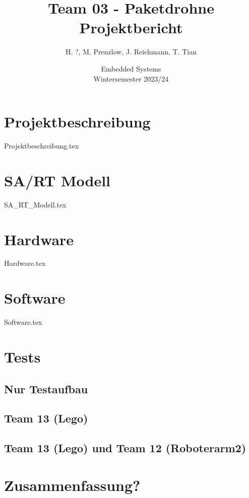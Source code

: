 \documentclass[a4paper,11pt,oneside]{article}
\title{Team 03 - Paketdrohne \\ \textbf{Projektbericht}}
\author{H. ?, M. Prenzlow, J. Reichmann, T. Tian}
\date{Embedded Systems \\ Wintersemester 2023/24}
\begin{document}
\pagestyle{fancy}
\maketitle
\newpage

\tableofcontents
\newpage


\section{Projektbeschreibung}
{Projektbeschreibung.tex}

\section{SA/RT Modell}
{SA_RT_Modell.tex}

\section{Hardware}
{Hardware.tex} %

\section{Software}
{Software.tex}

\section{Tests}
\subsection{Nur Testaufbau}
\subsection{Team 13 (Lego)}
\subsection{Team 13 (Lego) und Team 12 (Roboterarm2)}

\section{Zusammenfassung?}

\listoffigures
\listoftables
\end{document}
